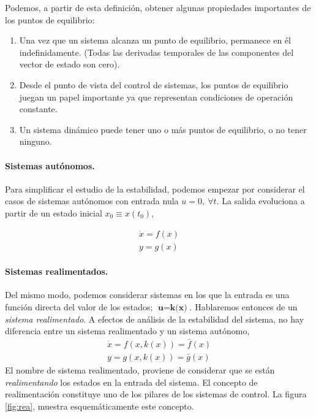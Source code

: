 Podemos, a partir de esta definición, obtener algunas propiedades importantes de los puntos de equilibrio:
\begin{enumerate}
\item Una vez que un sistema alcanza un punto de equilibrio, permanece en él indefinidamente. (Todas las derivadas temporales de las componentes del vector de estado son cero).
\item Desde el punto de vista del control de sistemas, los puntos de equilibrio juegan un papel importante ya que representan condiciones de operación constante.
\item Un sistema dinámico puede tener uno o más puntos de equilibrio, o no tener ninguno. 
\end{enumerate}

\paragraph{Sistemas autónomos.} Para simplificar el estudio de la estabilidad, podemos empezar por considerar el casos de sistemas autónomos con entrada nula  $u = 0, \ \forall t$. La salida evoluciona a partir de un estado inicial $x_0\equiv x(t_0)$,

\begin{align}
\dot{x} = f(x) \label{eq:310}\\
y = g(x)
\end{align}\label{eq:311}

\paragraph{Sistemas realimentados.} Del mismo modo, podemos considerar sistemas en los que la entrada es una función directa del valor de los estados; $\textbf{u}= \textbf{k(x)}$. Hablaremos entonces de un \emph{sistema realimentado}. A efectos de análisis de la estabilidad del sistema, no hay diferencia entre un sistema realimentado y un sistema autónomo,
\begin{align}
\dot{x} = f(x,k(x)) = \bar{f}(x)\\
y = g(x,k(x)) = \bar{g}(x)
\end{align}
El nombre de sistema realimentado, proviene de considerar que se están \emph{realimentando} los estados en la entrada del sistema. El concepto de realimentación constituye uno de los pilares de los sistemas de control. La figura \ref{fig:rea}, muestra esquemáticamente este concepto.

